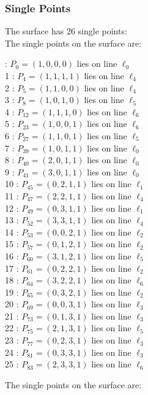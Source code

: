 \documentclass{article}
\begin{document}
{\subsubsection*{Single Points}
The surface has 26 single points:\\
The single points on the surface are:\\
\begin{multicols}{2}
 : $P_{0}=( 1, 0, 0, 0 )$ lies on line $\ell_{0}$\\
1 : $P_{4}=( 1, 1, 1, 1 )$ lies on line $\ell_{4}$\\
2 : $P_{5}=( 1, 1, 0, 0 )$ lies on line $\ell_{4}$\\
3 : $P_{8}=( 1, 0, 1, 0 )$ lies on line $\ell_{5}$\\
4 : $P_{12}=( 1, 1, 1, 0 )$ lies on line $\ell_{6}$\\
5 : $P_{23}=( 1, 0, 0, 1 )$ lies on line $\ell_{6}$\\
6 : $P_{27}=( 1, 1, 0, 1 )$ lies on line $\ell_{5}$\\
7 : $P_{39}=( 1, 0, 1, 1 )$ lies on line $\ell_{0}$\\
8 : $P_{40}=( 2, 0, 1, 1 )$ lies on line $\ell_{0}$\\
9 : $P_{41}=( 3, 0, 1, 1 )$ lies on line $\ell_{0}$\\
10 : $P_{45}=( 0, 2, 1, 1 )$ lies on line $\ell_{1}$\\
11 : $P_{47}=( 2, 2, 1, 1 )$ lies on line $\ell_{4}$\\
12 : $P_{49}=( 0, 3, 1, 1 )$ lies on line $\ell_{1}$\\
13 : $P_{52}=( 3, 3, 1, 1 )$ lies on line $\ell_{4}$\\
14 : $P_{53}=( 0, 0, 2, 1 )$ lies on line $\ell_{2}$\\
15 : $P_{57}=( 0, 1, 2, 1 )$ lies on line $\ell_{2}$\\
16 : $P_{60}=( 3, 1, 2, 1 )$ lies on line $\ell_{5}$\\
17 : $P_{61}=( 0, 2, 2, 1 )$ lies on line $\ell_{2}$\\
18 : $P_{64}=( 3, 2, 2, 1 )$ lies on line $\ell_{6}$\\
19 : $P_{65}=( 0, 3, 2, 1 )$ lies on line $\ell_{2}$\\
20 : $P_{69}=( 0, 0, 3, 1 )$ lies on line $\ell_{3}$\\
21 : $P_{73}=( 0, 1, 3, 1 )$ lies on line $\ell_{3}$\\
22 : $P_{75}=( 2, 1, 3, 1 )$ lies on line $\ell_{5}$\\
23 : $P_{77}=( 0, 2, 3, 1 )$ lies on line $\ell_{3}$\\
24 : $P_{81}=( 0, 3, 3, 1 )$ lies on line $\ell_{3}$\\
25 : $P_{83}=( 2, 3, 3, 1 )$ lies on line $\ell_{6}$\\
\end{multicols}
The single points on the surface are:\\
}
\end{document}
